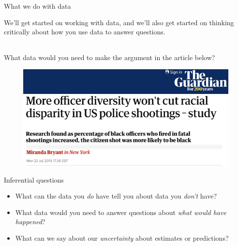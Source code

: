 \documentclass[xcolor={dvipsnames}]{beamer}
\begin{document}

\begin{frame}{What we do with data}

We'll get started on working with data, and we'll also get started on thinking critically about how you use data to answer questions.\\~\ \pause


What data would you need to make the argument in the article below?

\begin{figure}[htbp] %
   \centering
   \includegraphics[width=.8\textwidth]{../assets/guardian.png} 
\end{figure}

\end{frame}



\begin{frame}{Inferential questions}

\begin{itemize}
\item What can the data you \textit{do} have tell you about data you \textit{don't} have? \pause
\item What data would you need to answer questions about \textit{what would have happened}? \pause
\item What can we say about our \textit{uncertainty} about estimates or predictions?
\end{itemize}

\end{frame}
\end{document}
